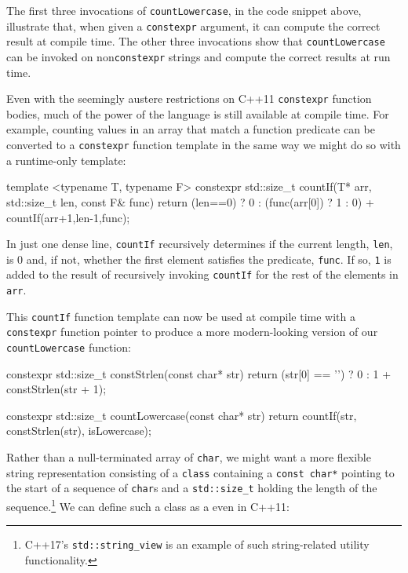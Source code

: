 \noindent The first three invocations of \lstinline!countLowercase!, in the code
snippet above, illustrate that, when given a \lstinline!constexpr!
argument, it can compute the correct result at compile time. The other
three invocations show that \lstinline!countLowercase! can be invoked on
non\lstinline!constexpr! strings and compute the correct results at run
time.

Even with the seemingly austere restrictions on C++11 \lstinline!constexpr!
function bodies, much of the power of the language is still available at
compile time. For example, counting values in an array that match a
function predicate can be converted to a \lstinline!constexpr! function
template in the same way we might do so with a runtime-only template:

\begin{emcppslisting}[emcppsbatch={e12,e13}]
template <typename T, typename F>
constexpr std::size_t countIf(T* arr, std::size_t len, const F& func)
{
    return (len==0) ? 0 : (func(arr[0]) ? 1 : 0) + countIf(arr+1,len-1,func);
}
\end{emcppslisting}
    

\noindent In just one dense line, \lstinline!countIf! recursively determines if the
current length, \lstinline!len!, is 0 and, if not, whether the first
element satisfies the predicate, \lstinline!func!. If so, \lstinline!1! is
added to the result of recursively invoking \lstinline!countIf! for the
rest of the elements in \lstinline!arr!.

This \lstinline!countIf! function template can now be used at compile time
with a \lstinline!constexpr! function pointer to produce a more
modern-looking version of our \lstinline!countLowercase! function:

\begin{emcppshiddenlisting}[emcppsbatch=e13]
constexpr std::size_t constStrlen(const char* str)
{
    return (str[0] == '\0') ? 0 : 1 + constStrlen(str + 1);
}
\end{emcppshiddenlisting}
\begin{emcppslisting}[emcppsbatch=e13]
constexpr std::size_t countLowercase(const char* str)
{
    return countIf(str, constStrlen(str), isLowercase);
}
\end{emcppslisting}
    

\noindent Rather than a null-terminated array of \lstinline!char!, we might want a
more flexible string representation consisting of a \lstinline!class!
containing a \lstinline!const!~\lstinline!char*! pointing to the start of a
sequence of \lstinline!char!s and a \lstinline!std::size_t! holding the
length of the sequence.{\cprotect\footnote{C++17's
\lstinline!std::string_view! is an example of such string-related
  utility functionality.}} We can define such a class as a
 even in C++11:

